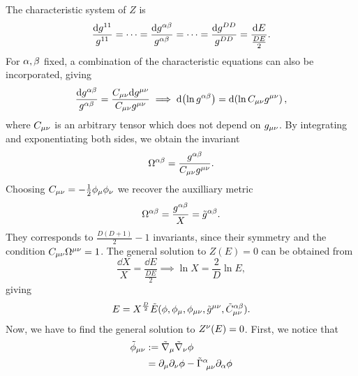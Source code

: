 The characteristic system of $Z$ is
\begin{equation}
  \frac{\dd g^{11}}{g^{11}}=\cdots=\frac{\dd g^{\alpha\beta }}{g^{\alpha\beta }}=\cdots=\frac{\dd g^{DD}}{g^{DD}}=\frac{\dd E}{\frac{DE}{2}}.
\end{equation}
For $\alpha,\beta $ fixed, a combination of the characteristic equations can also be incorporated, giving
\begin{equation}
  \frac{\dd g^{\alpha\beta }}{g^{\alpha\beta }}=\frac{C_{\mu\nu }\dd g^{\mu\nu }}{C_{\mu\nu }g^{\mu\nu }}\implies \dd (\ln g^{\alpha\beta })=\dd(\ln C_{\mu\nu }g^{\mu\nu }),
\end{equation}
where $C_{\mu\nu }$ is an arbitrary tensor which does not depend on $g_{\mu\nu }$. By integrating and exponentiating both sides, we obtain the invariant
\begin{equation}
  \Omega^{\alpha\beta }=\frac{g^{\alpha\beta }}{C_{\mu\nu }g^{\mu\nu }}.
\end{equation}
Choosing $C_{\mu\nu }=-\frac{1}{2}\phi_\mu \phi_\nu $ we recover the auxilliary metric
\begin{equation}
  \Omega^{\alpha\beta }=\frac{g^{\alpha\beta }}{X}=\tilde{g}^{\alpha\beta }.
\end{equation}
They corresponds to $\frac{D(D+1)}{2}-1$ invariants, since their symmetry and the condition $C_{\mu\nu }\Omega^{\mu\nu }=1$. The general solution to $Z(E)=0$ can be obtained from
\begin{equation}
  \frac{\dd X}{X}=\frac{\dd E}{\frac{DE}{2}}\implies \ln X=\frac{2}{D}\ln E,
\end{equation}
giving
\begin{equation}
  E=X^\frac{D}{2}\tilde{E}(\phi,\phi_\mu ,\phi_{\mu\nu },\tilde{g}^{\mu\nu },\tilde{C}^{\alpha\beta }_{\mu\nu }).
\end{equation}
Now, we have to find the general solution to $Z^\nu (E)=0$. First, we notice that
\begin{align}
  \tilde{\phi}_{\mu\nu }&:=\tilde{\nabla}_\mu \tilde{\nabla}_\nu \phi \\
  &=\partial_\mu \partial_\nu \phi -\tilde{\Gamma }^\alpha _{~\mu\nu }\partial_\alpha\phi
\end{align}






















